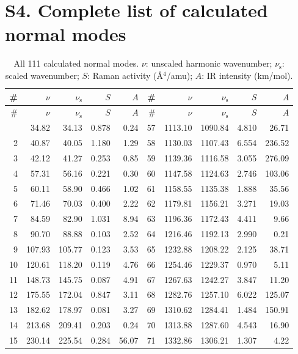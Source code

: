 \documentclass[11pt,a4paper]{article}
\begin{document}
\section*{S4. Complete list of calculated normal modes}

\begin{longtable}{rrrrr@{\hskip 1.6em}rrrrr}
\caption{All 111 calculated normal modes. $\nu$: unscaled harmonic wavenumber;
$\nu_{\mathrm{s}}$: scaled wavenumber; $S$: Raman activity (\AA$^4$/amu);
$A$: IR intensity (km/mol).}\\
\toprule
\# & $\nu$ & $\nu_{\mathrm{s}}$ & $S$ & $A$ &
\# & $\nu$ & $\nu_{\mathrm{s}}$ & $S$ & $A$ \\
\midrule
\endfirsthead
\toprule
\# & $\nu$ & $\nu_{\mathrm{s}}$ & $S$ & $A$ &
\# & $\nu$ & $\nu_{\mathrm{s}}$ & $S$ & $A$ \\
\midrule
\endhead
\bottomrule
\endfoot
1 & 34.82 & 34.13 & 0.878 & 0.24 & 57 & 1113.10 & 1090.84 & 4.810 & 26.71 \\
2 & 40.87 & 40.05 & 1.180 & 1.29 & 58 & 1130.03 & 1107.43 & 6.554 & 236.52 \\
3 & 42.12 & 41.27 & 0.253 & 0.85 & 59 & 1139.36 & 1116.58 & 3.055 & 276.09 \\
4 & 57.31 & 56.16 & 0.221 & 0.30 & 60 & 1147.58 & 1124.63 & 2.746 & 103.06 \\
5 & 60.11 & 58.90 & 0.466 & 1.02 & 61 & 1158.55 & 1135.38 & 1.888 & 35.56 \\
6 & 71.46 & 70.03 & 0.400 & 2.22 & 62 & 1179.81 & 1156.21 & 3.271 & 19.03 \\
7 & 84.59 & 82.90 & 1.031 & 8.94 & 63 & 1196.36 & 1172.43 & 4.411 & 9.66 \\
8 & 90.70 & 88.88 & 0.103 & 2.52 & 64 & 1216.46 & 1192.13 & 2.990 & 0.21 \\
9 & 107.93 & 105.77 & 0.123 & 3.53 & 65 & 1232.88 & 1208.22 & 2.125 & 38.71 \\
10 & 120.61 & 118.20 & 0.119 & 4.76 & 66 & 1254.46 & 1229.37 & 0.970 & 5.11 \\
11 & 148.73 & 145.75 & 0.087 & 4.91 & 67 & 1267.63 & 1242.27 & 3.847 & 11.20 \\
12 & 175.55 & 172.04 & 0.847 & 3.11 & 68 & 1282.76 & 1257.10 & 6.022 & 125.07 \\
13 & 182.62 & 178.97 & 0.081 & 3.27 & 69 & 1310.62 & 1284.41 & 1.484 & 150.91 \\
14 & 213.68 & 209.41 & 0.203 & 0.24 & 70 & 1313.88 & 1287.60 & 4.543 & 16.90 \\
15 & 230.14 & 225.54 & 0.284 & 56.07 & 71 & 1332.86 & 1306.21 & 1.307 & 4.22 \\

\end{longtable}
\end{document}
